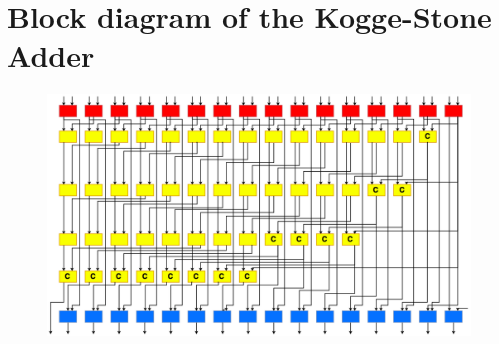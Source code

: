\section{Block diagram of the Kogge-Stone Adder} \label{app:ks_block}

\begin{figure}[H]
  \centering
  \captionsetup{justification=centering}
  \includegraphics[scale=0.5, angle=90]{../figures/ks_block}
\end{figure}

